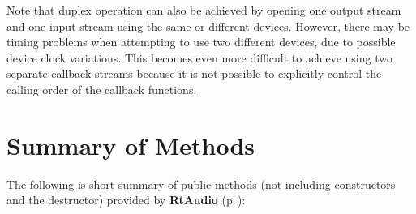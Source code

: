 Note that duplex operation can also be achieved by opening one output stream and one input stream using the same or different devices. However, there may be timing problems when attempting to use two different devices, due to possible device clock variations. This becomes even more difficult to achieve using two separate callback streams because it is not possible to explicitly control the calling order of the callback functions.

\section{Summary of Methods}\label{methods}


The following is short summary of public methods (not including constructors and the destructor) provided by {\bf Rt\-Audio} {\rm (p.\,\pageref{classRtAudio})}:


